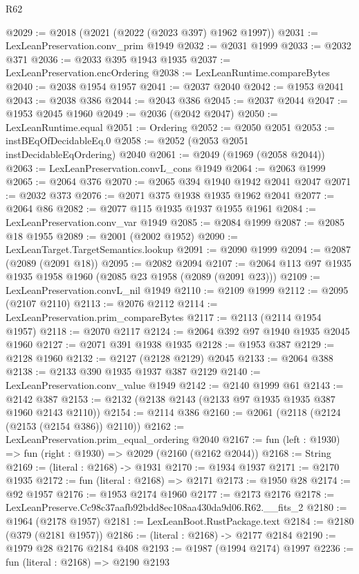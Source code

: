 \begin{lexlean}{R62}
\begin{coremodule}
@2029 := @2018 (@2021 (@2022 (@2023 @397) @1962 @1997))
@2031 := LexLeanPreservation.conv_prim @1949
@2032 := @2031 @1999
@2033 := @2032 @371
@2036 := @2033 @395 @1943 @1935
@2037 := LexLeanPreservation.encOrdering
@2038 := LexLeanRuntime.compareBytes
@2040 := @2038 @1954 @1957
@2041 := @2037 @2040
@2042 := @1953 @2041
@2043 := @2038 @386
@2044 := @2043 @386
@2045 := @2037 @2044
@2047 := @1953 @2045 @1960
@2049 := @2036 (@2042 @2047)
@2050 := LexLeanRuntime.equal
@2051 := Ordering
@2052 := @2050 @2051
@2053 := instBEqOfDecidableEq.{0}
@2058 := @2052 (@2053 @2051 instDecidableEqOrdering) @2040
@2061 := @2049 (@1969 (@2058 @2044))
@2063 := LexLeanPreservation.convL_cons @1949
@2064 := @2063 @1999
@2065 := @2064 @376
@2070 := @2065 @394 @1940 @1942 @2041 @2047
@2071 := @2032 @373
@2076 := @2071 @375 @1938 @1935 @1962 @2041
@2077 := @2064 @86
@2082 := @2077 @115 @1935 @1937 @1955 @1961
@2084 := LexLeanPreservation.conv_var @1949
@2085 := @2084 @1999
@2087 := @2085 @18 @1955
@2089 := @2001 (@2002 @1952)
@2090 := LexLeanTarget.TargetSemantics.lookup
@2091 := @2090 @1999
@2094 := @2087 (@2089 (@2091 @18))
@2095 := @2082 @2094
@2107 := @2064 @113 @97 @1935 @1935 @1958 @1960 (@2085 @23 @1958 (@2089 (@2091 @23)))
@2109 := LexLeanPreservation.convL_nil @1949
@2110 := @2109 @1999
@2112 := @2095 (@2107 @2110)
@2113 := @2076 @2112
@2114 := LexLeanPreservation.prim_compareBytes
@2117 := @2113 (@2114 @1954 @1957)
@2118 := @2070 @2117
@2124 := @2064 @392 @97 @1940 @1935 @2045 @1960
@2127 := @2071 @391 @1938 @1935
@2128 := @1953 @387
@2129 := @2128 @1960
@2132 := @2127 (@2128 @2129) @2045
@2133 := @2064 @388
@2138 := @2133 @390 @1935 @1937 @387 @2129
@2140 := LexLeanPreservation.conv_value @1949
@2142 := @2140 @1999 @61
@2143 := @2142 @387
@2153 := @2132 (@2138 @2143 (@2133 @97 @1935 @1935 @387 @1960 @2143 @2110))
@2154 := @2114 @386
@2160 := @2061 (@2118 (@2124 (@2153 (@2154 @386)) @2110))
@2162 := LexLeanPreservation.prim_equal_ordering @2040
@2167 := fun (left : @1930) => fun (right : @1930) => @2029 (@2160 (@2162 @2044))
@2168 := String
@2169 := (literal : @2168) -> @1931
@2170 := @1934 @1937
@2171 := @2170 @1935
@2172 := fun (literal : @2168) => @2171
@2173 := @1950 @28
@2174 := @92 @1957
@2176 := @1953 @2174 @1960
@2177 := @2173 @2176
@2178 := LexLeanPreserve.Cc98c37aafb92bdd8ec108aa430da9d06.R62.__fits_2
@2180 := @1964 (@2178 @1957)
@2181 := LexLeanBoot.RustPackage.text
@2184 := @2180 (@379 (@2181 @1957))
@2186 := (literal : @2168) -> @2177 @2184
@2190 := @1979 @28 @2176 @2184 @408
@2193 := @1987 (@1994 @2174) @1997
@2236 := fun (literal : @2168) =>
  @2190
    @2193

\end{coremodule}
\end{lexlean}
